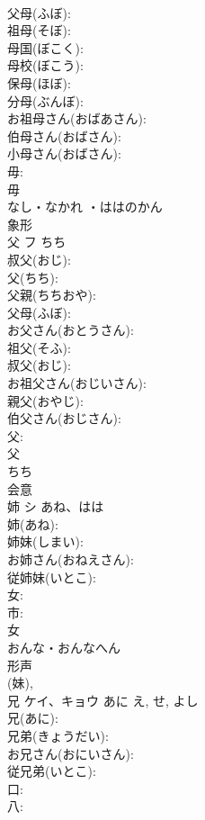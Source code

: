 \documentclass[8pt]{extreport}
\begin{document}
\begin{CJK}{UTF8}{min}
\\	父母(ふぼ): 
\\	祖母(そぼ): 
\\	母国(ぼこく): 
\\	母校(ぼこう): 
\\	保母(ほぼ): 
\\	分母(ぶんぼ): 
\\	お祖母さん(おばあさん): 
\\	伯母さん(おばさん): 
\\	小母さん(おばさん): 
\\	毋: 
\\	毋	
\\	なし・なかれ ・ははのかん	
\\	象形 
\\	父	フ	ちち		
\\	叔父(おじ): 
\\	父(ちち): 
\\	父親(ちちおや): 
\\	父母(ふぼ): 
\\	お父さん(おとうさん): 
\\	祖父(そふ): 
\\	叔父(おじ): 
\\	お祖父さん(おじいさん): 
\\	親父(おやじ): 
\\	伯父さん(おじさん): 
\\	父: 
\\	父	
\\	ちち	
\\	会意 
\\	姉	シ	あね、はは		
\\	姉(あね): 
\\	姉妹(しまい): 
\\	お姉さん(おねえさん): 
\\	従姉妹(いとこ): 
\\	女: 
\\	市: 
\\	女	
\\	おんな・おんなへん	
\\	形声 
\\	(妹), 
\\	兄	ケイ、キョウ	あに	え, せ, よし	
\\	兄(あに): 
\\	兄弟(きょうだい): 
\\	お兄さん(おにいさん): 
\\	従兄弟(いとこ): 
\\	口: 
\\	八: 

\end{CJK}
\end{document}

